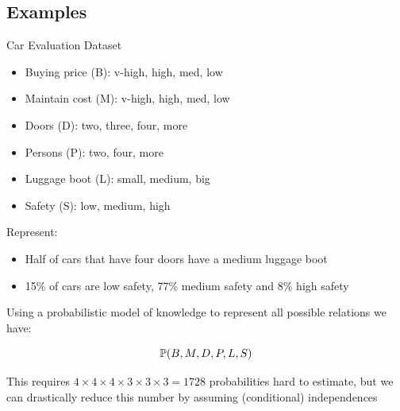 \subsection{Examples}

\begin{frame}
	\begin{block}{Car Evaluation Dataset}
		\begin{itemize}
			\item Buying price (B): v-high, high, med, low
			\item Maintain cost (M): v-high, high, med, low
			\item Doors (D): two, three, four, more
			\item Persons (P): two, four, more
			\item Luggage boot (L): small, medium, big
			\item Safety (S): low, medium, high
		\end{itemize}
	\end{block}
	Represent:
	\begin{block}{}
		\begin{itemize}
			\item Half of cars that have four doors have a medium luggage boot
			\item 15\% of cars are low safety, 77\% medium safety and 8\% high safety
		\end{itemize}
	\end{block}
\end{frame}
	
\begin{frame}
	Using a probabilistic model of knowledge to represent all possible relations we have:
	\begin{block}{}
		\[ \P( B , M , D , P , L , S ) \]
	\end{block}
	This requires $4 \times 4 \times 4 \times 3 \times 3 \times 3 = 1728$ probabilities hard to estimate, but we can drastically reduce this number by assuming (conditional) independences
\end{frame}
	
